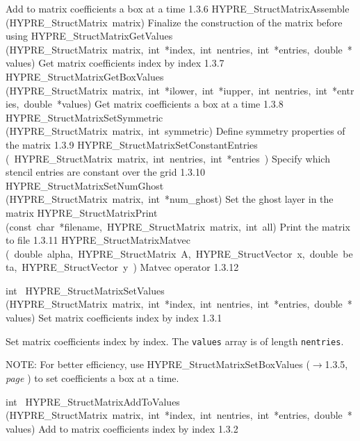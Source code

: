 \documentclass{article}
\begin{document}
\begin{cxxentry}
\begin{cxxentry}
\begin{cxxnames}
        {
Add to matrix coefficients a box at a time}
        {1.3.6}
        {HYPRE\_StructMatrixAssemble}
        {(HYPRE\_StructMatrix\ matrix)}
        {
Finalize the construction of the matrix before using}
        {}
\label{cxx.1.3.17}
        {HYPRE\_StructMatrixGetValues}
        {(HYPRE\_StructMatrix\ matrix,\ int\ *index,\ int\ nentries,\ int\ *entries,\ double\ *values)}
        {
Get matrix coefficients index by index}
        {1.3.7}
        {HYPRE\_StructMatrixGetBoxValues}
        {(HYPRE\_StructMatrix\ matrix,\ int\ *ilower,\ int\ *iupper,\ int\ nentries,\ int\ *entries,\ double\ *values)}
        {
Get matrix coefficients a box at a time}
        {1.3.8}
        {HYPRE\_StructMatrixSetSymmetric}
        {(HYPRE\_StructMatrix\ matrix,\ int\ symmetric)}
        {
Define symmetry properties of the matrix}
        {1.3.9}
        {HYPRE\_StructMatrixSetConstantEntries}
        {(\ HYPRE\_StructMatrix\ matrix,\ int\ nentries,\ int\ *entries\ )}
        {
Specify which stencil entries are constant over the grid}
        {1.3.10}
        {HYPRE\_StructMatrixSetNumGhost}
        {(HYPRE\_StructMatrix\ matrix,\ int\ *num\_ghost)}
        {
Set the ghost layer in the matrix }
        {}
\label{cxx.1.3.18}
        {HYPRE\_StructMatrixPrint}
        {(const\ char\ *filename,\ HYPRE\_StructMatrix\ matrix,\ int\ all)}
        {
Print the matrix to file}
        {1.3.11}
        {HYPRE\_StructMatrixMatvec}
        {(\ double\ alpha,\ HYPRE\_StructMatrix\ A,\ HYPRE\_StructVector\ x,\ double\ beta,\ HYPRE\_StructVector\ y\ )}
        {
Matvec operator}
        {1.3.12}
\end{cxxnames}
\begin{cxxfunction}
{int\ }
        {HYPRE\_StructMatrixSetValues}
        {(HYPRE\_StructMatrix\ matrix,\ int\ *index,\ int\ nentries,\ int\ *entries,\ double\ *values)}
        {
Set matrix coefficients index by index}
        {1.3.1}
\begin{cxxdoc}

Set matrix coefficients index by index.  The {\tt values} array is of length
{\tt nentries}.

NOTE: For better efficiency, use HYPRE\_StructMatrixSetBoxValues ($\rightarrow$1.3.5, {\em page \pageref{cxx.1.3.5}}) to set
coefficients a box at a time.
\end{cxxdoc}
\end{cxxfunction}
\begin{cxxfunction}
{int\ }
        {HYPRE\_StructMatrixAddToValues}
        {(HYPRE\_StructMatrix\ matrix,\ int\ *index,\ int\ nentries,\ int\ *entries,\ double\ *values)}
        {
Add to matrix coefficients index by index}
        {1.3.2}
\begin{cxxdoc}


\end{cxxdoc}
\end{cxxfunction}
\end{cxxentry}
\end{cxxentry}
\end{document}
